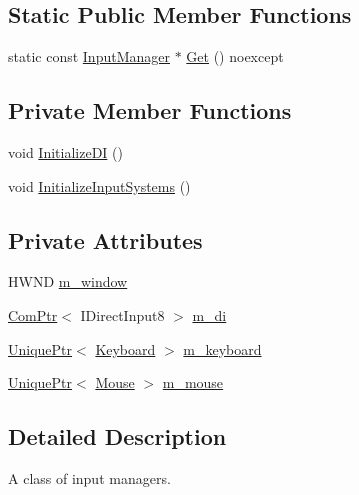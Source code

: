 \subsection*{Static Public Member Functions}
\begin{DoxyCompactItemize}
\item 
static const \hyperlink{classmage_1_1_input_manager}{Input\+Manager} $\ast$ \hyperlink{classmage_1_1_input_manager_a793d1172963fadb3c89f4d291020493d}{Get} () noexcept
\end{DoxyCompactItemize}
\subsection*{Private Member Functions}
\begin{DoxyCompactItemize}
\item 
void \hyperlink{classmage_1_1_input_manager_aaee6f1acc558620d2cf6313f3eb36a35}{Initialize\+DI} ()
\item 
void \hyperlink{classmage_1_1_input_manager_a73ec320ef9f3809f092b98da50f99840}{Initialize\+Input\+Systems} ()
\end{DoxyCompactItemize}
\subsection*{Private Attributes}
\begin{DoxyCompactItemize}
\item 
H\+W\+ND \hyperlink{classmage_1_1_input_manager_a2f8a8cc8c12b899a0c3b9983bdef6ed6}{m\+\_\+window}
\item 
\hyperlink{namespacemage_ae74f374780900893caa5555d1031fd79}{Com\+Ptr}$<$ I\+Direct\+Input8 $>$ \hyperlink{classmage_1_1_input_manager_a0ffbd0e68b5bab33c35f310625884f3a}{m\+\_\+di}
\item 
\hyperlink{namespacemage_a3316d7143a973e37adf1110f2e80ca31}{Unique\+Ptr}$<$ \hyperlink{classmage_1_1_keyboard}{Keyboard} $>$ \hyperlink{classmage_1_1_input_manager_a196bdd04e169e89d0fa5f6a4a180e4cb}{m\+\_\+keyboard}
\item 
\hyperlink{namespacemage_a3316d7143a973e37adf1110f2e80ca31}{Unique\+Ptr}$<$ \hyperlink{classmage_1_1_mouse}{Mouse} $>$ \hyperlink{classmage_1_1_input_manager_aab9773cccf9626a7e2acb99227b42e37}{m\+\_\+mouse}
\end{DoxyCompactItemize}


\subsection{Detailed Description}
A class of input managers. 

